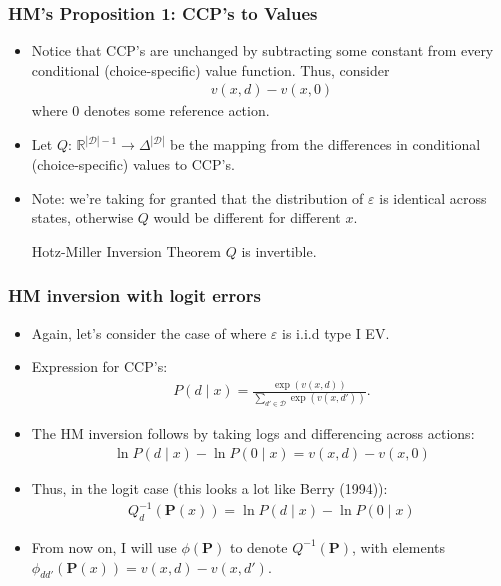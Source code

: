 \documentclass[aspectratio=169,11pt]{beamer}
\begin{document}
\begin{frame}
\frametitle{HM's Proposition 1: CCP's to Values}
\begin{itemize}
	\item Notice that CCP's are unchanged by subtracting some constant from every conditional (choice-specific) value function. Thus, consider
	\begin{align*}
	v(x,d) - v(x,0)
	\end{align*}
	where $0$ denotes some reference action.
	\medskip
	\item Let $Q:\, \mathbb{R}^{\left| \mathcal{D}\right|-1} \rightarrow \Delta^{\left| \mathcal{D}\right|}$ be the mapping
	from the \alert{differences in conditional (choice-specific) values to CCP's}.
	\medskip
	\item Note: we're taking for granted that the distribution of $\varepsilon$ is identical across states, otherwise
	$Q$ would be different for different $x$.
	\begin{block}{Hotz-Miller Inversion Theorem}
	$Q$ is invertible.
	\end{block}
\end{itemize}
\end{frame}

\begin{frame}
\frametitle{HM inversion with logit errors}
\small
\begin{itemize}
	\item Again, let's consider the case of where $\varepsilon$ is i.i.d type I EV.
	\smallskip
	\item Expression for CCP's:
	\begin{align*}
	P(d \mid x) = \frac{\exp\left(v(x,d)\right)}{\sum_{d'\in \mathcal{D}}\exp\left(v(x,d')\right)}.
	\end{align*}
	\item The HM inversion follows by taking logs and differencing across actions:
	\begin{align*}
		\ln P(d \mid x) - \ln P(0 \mid x) = v(x,d) - v(x,0)
	\end{align*}
	\item Thus, in the logit case (this looks a lot like Berry (1994)):
	\begin{align*}
	Q_{d}^{-1} \left(\symbf{P}(x) \right) = \ln P(d \mid x) - \ln P(0 \mid x)
	\end{align*}
	\item From now on, I will use $\phi(\symbf{P})$ to denote $Q^{-1}(\symbf{P})$, with elements $\phi_{dd'}(\symbf{P}(x)) = v(x,d) - v(x,d')$.

\end{itemize}
\end{frame}
\end{document}
